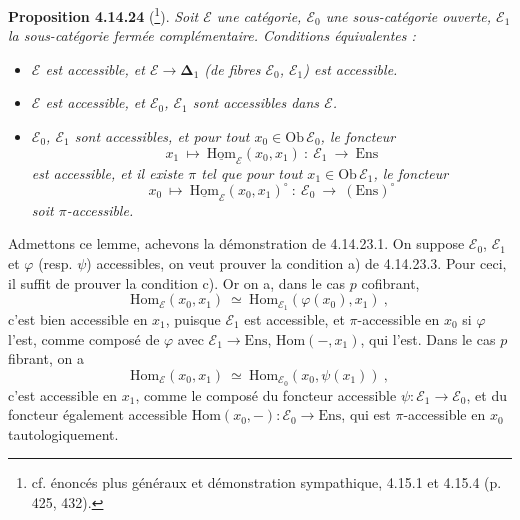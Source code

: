 \documentclass[11pt]{article}
\newcommand{\printedpage}[1]{\marginpar{\footnotesize p.~#1}}
\newcommand{\msp}[1]{\marginpar{\footnotesize [#1]}}
\newcommand{\uHom}{\underline{\mathrm{Hom}}}
\newcommand{\bDelta}{\boldsymbol{\Delta}}
\newcommand{\Ens}{\mathrm{Ens}}
\newcommand{\Ob}{\mathrm{Ob}\,}
\newcommand{\Hom}{\mathrm{Hom}}
\begin{document}
\textbf{Proposition 4.14.24} (\footnote[173]{cf. énoncés plus généraux et démonstration sympathique, 4.15.1 et 4.15.4 (p. 425, 432).}). \textit{Soit $\mathcal{E}$ une catégorie, $\mathcal{E}_0$ une sous-catégorie ouverte, $\mathcal{E}_1$ la sous-catégorie fermée complémentaire. Conditions équivalentes :}
\begin{itemize}[leftmargin=*]
\item[\textit{a)}] \textit{$\mathcal{E}$ est accessible, et $\mathcal{E}\longrightarrow\bDelta_1$ (de fibres $\mathcal{E}_0$, $\mathcal{E}_1$) est accessible.}
\item[\textit{b)}] \textit{$\mathcal{E}$ est accessible, et $\mathcal{E}_0$, $\mathcal{E}_1$ sont accessibles dans $\mathcal{E}$.}
\item[\textit{c)}] \textit{$\mathcal{E}_0$, $\mathcal{E}_1$ sont accessibles, et pour tout $x_0\in\Ob\mathcal{E}_0$, le foncteur}
\[
x_1\ \longmapsto\ \uHom_{\mathcal{E}}(x_0,x_1)\ :\ \mathcal{E}_1\ \longrightarrow\ \Ens
\]
\msp{page 414}
\textit{est accessible, et il existe $\pi$ tel que pour tout $x_1\in\Ob\mathcal{E}_1$, le foncteur}
\[
x_0\ \longmapsto\ \uHom_{\mathcal{E}}(x_0,x_1)^{\circ}\ :\ \mathcal{E}_0\ \longrightarrow\ (\Ens)^{\circ}
\]
\textit{soit $\pi$-accessible.}
\end{itemize}

\printedpage{157}
Admettons ce lemme, achevons la démonstration de 4.14.23.1. On suppose $\mathcal{E}_0$, $\mathcal{E}_1$ et $\varphi$ (resp. $\psi$) accessibles, on veut prouver la condition a) de 4.14.23.3. Pour ceci, il suffit de prouver la condition c). Or on a, dans le cas $p$ cofibrant, %
\[
\Hom_{\mathcal{E}}(x_0,x_1)\ \simeq\ \Hom_{\mathcal{E}_1}(\varphi(x_0),x_1)\ ,
\]
c'est bien accessible en $x_1$, puisque $\mathcal{E}_1$ est accessible, et $\pi$-accessible en $x_0$ si $\varphi$ l'est, comme composé de $\varphi$ avec $\mathcal{E}_1\longrightarrow\Ens$, $\Hom(-,x_1)$, qui l'est. Dans le cas $p$ fibrant, on a
\[
\Hom_{\mathcal{E}}(x_0,x_1)\ \simeq\ \Hom_{\mathcal{E}_0}(x_0,\psi(x_1))\ ,
\]
c'est accessible en $x_1$, comme le composé du foncteur accessible $\psi:\mathcal{E}_1\longrightarrow\mathcal{E}_0$, et du foncteur également accessible $\Hom(x_0,-):\mathcal{E}_0\longrightarrow\Ens$, qui est $\pi$-accessible en $x_0$ tautologiquement.
\end{document}
